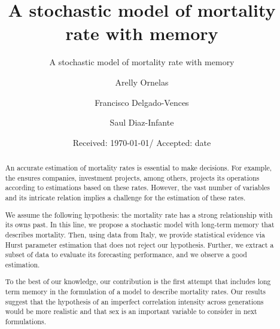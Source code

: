 \documentclass[smallextended]{svjour3}
\begin{document}
    \title{A stochastic model of mortality rate with memory}

    \subtitle{A stochastic model of mortality rate with memory}
    \author{Arelly Ornelas
        \and
        Francisco Delgado-Vences
        \and
        Saul Diaz-Infante
    }
%
    \date{Received: \today / Accepted: date}
    \maketitle
%
\begin{abstract}
        An accurate estimation of mortality rates is essential to make
    decisions. For example, the ensures companies, investment projects, among
    others, projects its operations according to estimations  based on  these
    rates. However, the vast number of variables and its intricate relation
    implies a challenge for the estimation of these rates.

        We assume the following hypothesis: the mortality rate has a strong
    relationship with its owns past. In this line, we propose a stochastic
    model with long-term memory that describes mortality. Then, using data from
    Italy, we provide statistical evidence via Hurst parameter estimation that
    does not reject our hypothesis. Further, we extract a subset of data to
    evaluate its forecasting performance, and we observe a good estimation.

        To the best of our knowledge, our contribution is the first attempt
    that includes long term memory in the formulation of a model to
    describe mortality rates. Our results suggest that the hypothesis of an
    imperfect correlation intensity across generations would be more realistic
    and that sex is an important variable to consider in next formulations.
\end{abstract}
%
%
\end{document}
